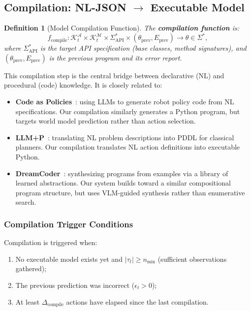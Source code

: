 \documentclass{article}
\newtheorem{definition}{Definition}
\newcommand{\calA}{\mathcal{A}}
\newcommand{\calK}{\mathcal{K}}
\newcommand{\calM}{\mathcal{M}}
\begin{document}
\subsection{Compilation: NL-JSON $\to$ Executable Model}
\label{sec:compilation}

\begin{definition}[Model Compilation Function]
\label{def:compile}
The \textbf{compilation function} is:
\begin{equation}
f_{\text{compile}} : \calK^{\calA}_t \times \calK^{\calM}_t \times \Sigma^*_{\text{API}} \times (\theta_{\text{prev}}, E_{\text{prev}}) \longrightarrow \theta \in \Sigma^*,
\end{equation}
where $\Sigma^*_{\text{API}}$ is the target API specification (base classes, method signatures), and $(\theta_{\text{prev}}, E_{\text{prev}})$ is the previous program and its error report.
\end{definition}

This compilation step is the central bridge between declarative (NL) and procedural (code) knowledge.  It is closely related to:

\begin{itemize}[nosep]
    \item \textbf{Code as Policies}~\cite{liang2023code}: using LLMs to generate robot policy code from NL specifications.  Our compilation similarly generates a Python program, but targets world model prediction rather than action selection.
    \item \textbf{LLM+P}~\cite{liu2023llmp}: translating NL problem descriptions into PDDL for classical planners.  Our compilation translates NL action definitions into executable Python.
    \item \textbf{DreamCoder}~\cite{ellis2021dreamcoder}: synthesizing programs from examples via a library of learned abstractions.  Our system builds toward a similar compositional program structure, but uses VLM-guided synthesis rather than enumerative search.
\end{itemize}

\subsubsection{Compilation Trigger Conditions}
\label{sec:compile_trigger}

Compilation is triggered when:
\begin{enumerate}[nosep]
    \item No executable model exists yet and $|\tau_t| \geq n_{\min}$ (sufficient observations gathered);
    \item The previous prediction was incorrect ($\epsilon_t > 0$);
    \item At least $\Delta_{\text{compile}}$ actions have elapsed since the last compilation.
\end{enumerate}
\end{document}
